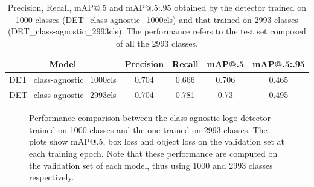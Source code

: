 \begin{table}[H]
    \centering
    \begin{tabular}{c|c|c|c|c}
        \hline
        \textbf{Model} &
        \textbf{Precision} &
        \textbf{Recall} &
        \textbf{mAP@.5} &
        \textbf{mAP@.5:.95} \\
        \hline
        \hline
DET\_class-agnostic\_1000cls&0.704&0.666&0.706&0.465\\
DET\_class-agnostic\_2993cls&0.704&0.781&0.73&0.495\\
\hline
\end{tabular}
\caption{Precision, Recall, mAP@.5 and mAP@.5:.95 obtained by the detector trained on 1000 classes (DET\_class-agnostic\_1000cls) and that trained on 2993 classes (DET\_class-agnostic\_2993cls). The performance refers to the test set composed of all the 2993 classes.}
    \label{table:exp-det_2993}
\end{table}

\begin{figure}[H]
	\centering
    \qquad
    \caption{Performance comparison between the class-agnostic logo detector trained on 1000 classes and the one trained on 2993 classes. The plots show mAP@.5, box loss and object loss on the validation set at each training epoch. Note that these performance are computed on the validation set of each model, thus using 1000 and 2993 classes respectively.}
	\label{fig:exp-det_2993}
\end{figure}


